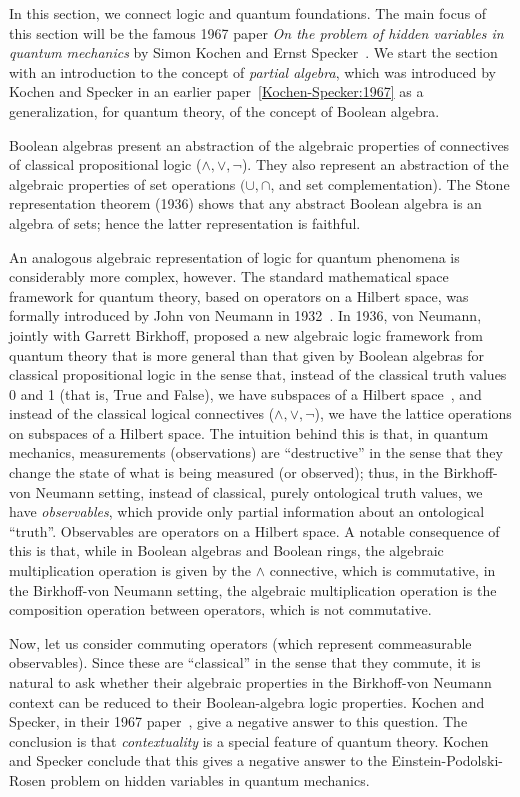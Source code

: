 \documentclass{scrartcl}
\begin{document}
In this section, we connect logic and quantum foundations. The main focus of this section will be the famous 1967 paper \emph{On the problem of hidden variables in quantum mechanics} by Simon Kochen and Ernst Specker~\cite{Kochen-Specker:1967}. We start the section with an introduction to the concept of \emph{partial algebra}, which was introduced by Kochen and Specker in an earlier paper~\ref{Kochen-Specker:1967} as a generalization, for quantum theory, of the concept of Boolean algebra.

\begin{history}
Boolean algebras present an abstraction of the algebraic properties of connectives of classical propositional logic ($\land,\lor,\neg$). They also represent an abstraction of the algebraic properties of set operations $(\cup, \cap$, and set complementation). The Stone representation theorem (1936) shows that any abstract Boolean algebra is an algebra of sets; hence the latter representation is faithful. 

An analogous algebraic representation of logic for quantum phenomena is considerably more complex, however. The standard mathematical space framework for quantum theory, based on operators on a Hilbert space, was formally introduced by John von Neumann in 1932~\cite{Neumann:1943}. In 1936, von Neumann, jointly with Garrett Birkhoff, proposed a new algebraic logic framework from quantum theory that is more general than that given by Boolean algebras for classical propositional logic in the sense that, instead of the classical truth values 0 and 1 (that is, True and False), we have subspaces of a Hilbert space~\cite{Birkhoff-Neumann:1936}, and instead of the classical logical connectives ($\land,\lor,\neg$), we have the lattice operations on subspaces of a Hilbert space. The intuition behind this is that, in quantum mechanics, measurements (observations) are ``destructive'' in the sense that they change the state of what is being measured (or observed); thus, in the Birkhoff-von Neumann setting, instead of classical, purely ontological truth values, we have \emph{observables}, which provide only partial information about an ontological ``truth''. Observables are operators on a Hilbert space. A notable consequence of this is that, while in Boolean algebras and Boolean rings, the algebraic  multiplication operation is given by the $\land$ connective, which is commutative, in the Birkhoff-von Neumann setting, the algebraic multiplication operation is the composition operation between operators, which is not commutative. 

Now, let us consider commuting operators (which represent commeasurable observables). Since these are ``classical'' in the sense that they commute, it is natural to ask whether their algebraic properties in the Birkhoff-von Neumann context can be reduced to their Boolean-algebra logic properties. Kochen and Specker, in their 1967 paper~\cite{Kochen-Specker:1967}, give a negative answer to this question. The conclusion is that \emph{contextuality} is a special feature of quantum theory. Kochen and Specker conclude that this gives a negative answer to the Einstein-Podolski-Rosen problem on hidden variables in quantum mechanics. 
\end{history}
\end{document}
